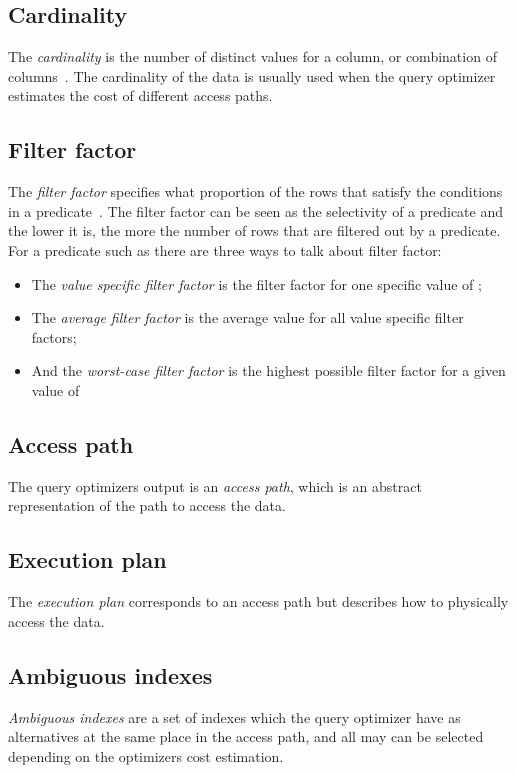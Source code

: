 \subsection*{Cardinality}
The \textit{cardinality} is the number of distinct values for a column, or combination of columns~\cite{lahdenmaki_2005_relational_rdidatodossea}. The cardinality of the data is usually used when the query optimizer estimates the cost of different access paths.

\subsection*{Filter factor}
The \textit{filter factor} specifies what proportion of the rows that    satisfy the conditions in a predicate~\cite{lahdenmaki_2005_relational_rdidatodossea}. The filter factor can be seen as the selectivity of a predicate and the lower it is, the more the number of rows that are filtered out by a predicate. For a predicate such as  there are three ways to talk about filter factor:
\begin{itemize}
    \item The \textit{value specific filter factor} is the filter factor for one specific value of ;
    \item The \textit{average filter factor} is the average value for all value specific filter factors;
    \item And the \textit{worst-case filter factor} is the highest possible filter factor for a given value of 
\end{itemize}

\subsection*{Access path}
The query optimizers output is an \textit{access path}, which is an abstract representation of the path to access the data.

\subsection*{Execution plan}
The \textit{execution plan} corresponds to an access path but describes how to physically access the data.

\subsection*{Ambiguous indexes}
\textit{Ambiguous indexes} are a set of indexes which the query optimizer have as alternatives at the same place in the access path, and all may can be selected depending on the optimizers cost estimation.